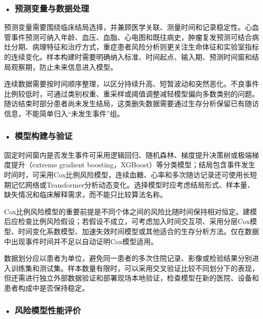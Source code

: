 \subsubsection*{\textbf{• 预测变量与数据处理}}

预测变量需要围绕临床结局选择，并兼顾医学关联、测量时间和记录稳定性。心血管事件预测可纳入年龄、血压、血脂、心电图和既往病史，肿瘤复发预测可结合病灶分期、病理特征和治疗方式，重症患者风险分析则更关注生命体征和实验室指标的连续变化。样本构建时需要明确纳入标准、时间起点、输入期、预测时间窗和结局观察期，防止未来信息进入模型。

连续数据需要按时间顺序整理，以区分持续升高、短暂波动和突然恶化。不良事件比例较低时，可通过类别权重、重采样或阈值调整减轻模型偏向多数类别的问题。随访结束时部分患者尚未发生结局，这类删失数据需要通过生存分析保留已有随访信息，不能简单归入“未发生事件”组。

\subsubsection*{\textbf{• 模型构建与验证}}

固定时间窗内是否发生事件可采用逻辑回归、随机森林、梯度提升决策树或极端梯度提升（extreme gradient boosting，XGBoost）等分类模型；结局包含事件发生时间时，可采用Cox比例风险模型，连续血糖、心率和多次随访记录还可使用长短期记忆网络或Transformer分析动态变化。选择模型时应考虑结局形式、样本量、缺失情况和临床解释需求，而不能只比较算法名称。

Cox比例风险模型的重要前提是不同个体之间的风险比随时间保持相对恒定。建模后应检查比例风险假设；若假设不成立，可考虑加入时间交互项、采用分层Cox模型、时间变化系数模型、加速失效时间模型或其他适合的生存分析方法。仅在数据中出现事件时间并不足以自动证明Cox模型适用。

数据划分应以患者为单位，避免同一患者的多次住院记录、影像或检验结果分别进入训练集和测试集。样本数量有限时，可以采用交叉验证比较不同划分下的表现，但还需进行独立外部数据验证和部署现场本地验证，检查模型在新的医院、设备和患者构成中是否保持稳定。

\subsubsection*{\textbf{• 风险模型性能评价}}

